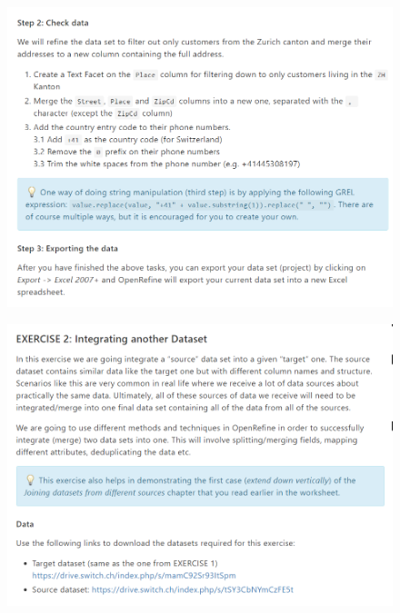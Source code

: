 \begin{figure}[H]
    \includegraphics[width=\linewidth]{./Figures/Appendices/worksheet/24.png}
\end{figure}
\begin{figure}[H]
    \includegraphics[width=\linewidth]{./Figures/Appendices/worksheet/25.png}
\end{figure}
